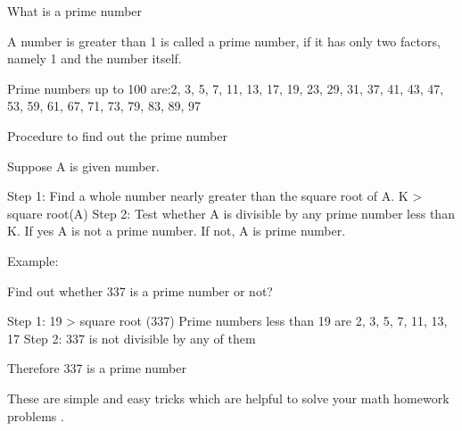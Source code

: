 \documentclass[12pt]{article}
\begin{document}
What is a prime number

A number is greater than 1 is called a prime number, if it has only two factors, namely 1 and the number itself.

Prime numbers up to 100 are:2, 3, 5, 7, 11, 13, 17, 19, 23, 29, 31, 37, 41, 43, 47, 53, 59, 61, 67, 71, 73, 79, 83, 89, 97

Procedure to find out the prime number

Suppose A is given number.

Step 1: Find a whole number nearly greater than the square root of A. K > square root(A)
Step 2: Test whether A is divisible by any prime number less than  K. If yes A is not a prime number. If not, A is prime  number.

Example:

Find out whether 337 is a prime number or not?

Step 1: 19 > square root (337) 
Prime numbers less than 19 are 2, 3, 5, 7, 11, 13, 17
Step 2: 337 is not divisible by any of them

Therefore 337 is a prime number

These are simple and easy tricks which are helpful to solve your math homework problems  .
\end{document}
